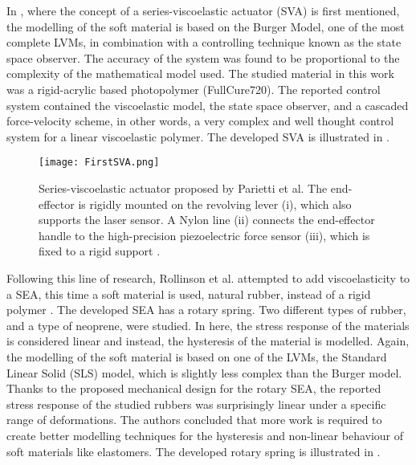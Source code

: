 In \cite{parietti2011series}, where the concept of a series-viscoelastic actuator (SVA) is first mentioned, the modelling of the soft material is based on the Burger Model, one of the most complete LVMs, in combination with a controlling technique known as the state space observer. The accuracy of the system was found to be proportional to the complexity of the mathematical model used. The studied material in this work was a rigid-acrylic based photopolymer (FullCure720). The reported control system contained the viscoelastic model, the state space observer, and a cascaded force-velocity scheme, in other words, a very complex and well thought control system for a linear viscoelastic polymer. The developed SVA is illustrated in . 

\begin{figure}[htb!]
	\centering
	\texttt{[image: FirstSVA.png]}
	\caption[Series-viscoelastic actuator proposed by Parietti et al. The end-effector is rigidly mounted on the revolving lever (i), which also supports the laser sensor. A Nylon line (ii) connects the end-effector handle to the high-precision piezoelectric force sensor (iii), which is fixed to a rigid support.]{Series-viscoelastic actuator proposed by Parietti et al. The end-effector is rigidly mounted on the revolving lever (i), which also supports the laser sensor. A Nylon line (ii) connects the end-effector handle to the high-precision piezoelectric force sensor (iii), which is fixed to a rigid support \cite{parietti2011series}.}
	\label{fig:firstSVA}
\end{figure}

Following this line of research, Rollinson et al. attempted to add viscoelasticity to a SEA, this time a soft material is used, natural rubber, instead of a rigid polymer \cite{rollinson2013design}. The developed SEA has a rotary spring. Two different types of rubber, and a type of neoprene, were studied. In here, the stress response of the materials is considered linear and instead, the hysteresis of the material is modelled. Again, the modelling of the soft material is based on one of the LVMs, the Standard Linear Solid (SLS) model, which is slightly less complex than the Burger model. Thanks to the proposed mechanical design for the rotary SEA, the reported stress response of the studied rubbers was surprisingly linear under a specific range of deformations. The authors concluded that more work is required to create better modelling techniques for the hysteresis and non-linear behaviour of soft materials like elastomers. The developed rotary spring is illustrated in .

